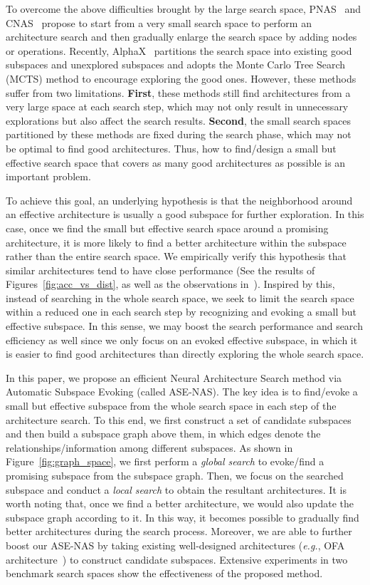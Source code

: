 \documentclass[lettersize,journal]{IEEEtran}
\newcommand{\sexyname}{ASE-NAS\xspace}
\def\eg{\emph{e.g.}} \def\Eg{\emph{E.g.}}
\begin{document}
To overcome the above difficulties brought by the large search space, PNAS~\cite{liu2018progressive} and CNAS~\cite{guo2020breaking} propose to start from a very small search space to perform an architecture search and then gradually enlarge the search space by adding nodes or operations.
Recently, AlphaX~\cite{wang2019alphax} partitions the search space into existing good subspaces and unexplored subspaces and adopts the Monte Carlo Tree Search (MCTS) method to encourage exploring the good ones.
However, these methods suffer from two limitations.
\textbf{First}, these methods still find architectures from a very large space at each search step, which may not only result in unnecessary explorations but also affect the search results.
\textbf{Second}, the small search spaces partitioned by these methods are fixed during the search phase, which may not be optimal to find good architectures.
Thus, how to find/design a small but effective search space that covers as many good architectures as possible is an important problem.

To achieve this goal, an underlying hypothesis is that the neighborhood around an effective architecture is usually a good subspace for further exploration.
In this case, once we find the small but effective search space around a promising architecture, it is more likely to find a better architecture within the subspace rather than the entire search space.
We empirically verify this hypothesis that similar architectures tend to have close performance (See the results of Figures~\ref{fig:acc_vs_dist}, as well as the observations in~\cite{ying2019bench,guo2020breaking}).
Inspired by this, instead of searching in the whole search space, we seek to limit the search space within a reduced one in each search step by recognizing and evoking a small but effective subspace.
In this sense, we may boost the search performance and search efficiency as well since we only focus on an evoked effective subspace, in which it is easier to find good architectures than directly exploring the whole search space.

In this paper, we propose an efficient Neural Architecture Search method via Automatic Subspace Evoking (called \sexyname). 
The key idea is to find/evoke a small but effective subspace from the whole search space in each step of the architecture search.
To this end, we first construct a set of candidate subspaces and then build a subspace graph above them, in which edges denote the relationships/information among different subspaces.
As shown in Figure~\ref{fig:graph_space}, 
we first perform a \textit{global search} to evoke/find a promising subspace from the subspace graph.
Then, we focus on the searched subspace and conduct a \textit{local search} to obtain the resultant architectures.
It is worth noting that, once we find a better architecture, we would also update the subspace graph according to it. In this way, it becomes possible to gradually find better architectures during the search process.
Moreover, we are able to further boost our \sexyname by taking existing well-designed architectures (\eg, OFA architecture~\cite{Cai2020Once}) to construct candidate subspaces.
Extensive experiments in two benchmark search spaces show the effectiveness of the proposed method.
\end{document}
